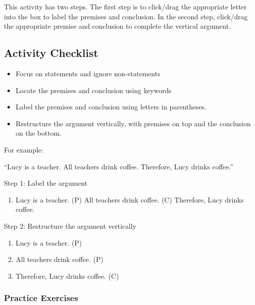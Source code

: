 \documentclass[
]{book}
\providecommand{\tightlist}{%
  \setlength{\itemsep}{0pt}\setlength{\parskip}{0pt}}
\begin{document}
This activity has two steps. The first step is to click/drag the appropriate letter into the box to label the premises and conclusion. In the second step, click/drag the appropriate premise and conclusion to complete the vertical argument.

\hypertarget{activity-checklist-1}{%
\subsection*{Activity Checklist}\label{activity-checklist-1}}

\begin{itemize}
\item
  Focus on statements and ignore non-statements
\item
  Locate the premises and conclusion using keywords
\item
  Label the premises and conclusion using letters in parentheses.
\item
  Restructure the argument vertically, with premises on top and the conclusion on the bottom.
\end{itemize}

For example:

``Lucy is a teacher. All teachers drink coffee. Therefore, Lucy drinks coffee.''

Step 1: Label the argument

\begin{enumerate}
\def\labelenumi{(\Alph{enumi})}
\setcounter{enumi}{15}
\tightlist
\item
  Lucy is a teacher. (P) All teachers drink coffee. (C) Therefore, Lucy drinks coffee.
\end{enumerate}

Step 2: Restructure the argument vertically

\begin{enumerate}
\def\labelenumi{\arabic{enumi}.}
\tightlist
\item
  Lucy is a teacher. (P)
\item
  All teachers drink coffee. (P)
\item
  Therefore, Lucy drinks coffee. (C)
\end{enumerate}

\hypertarget{practice-exercises}{%
\subsubsection*{Practice Exercises}\label{practice-exercises}}
\end{document}
